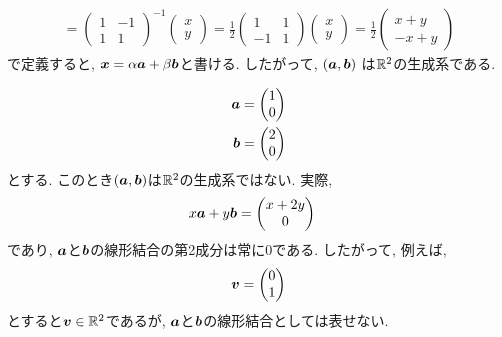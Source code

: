\begin{example}
\begin{align*}
=
    \begin{pmatrix}
      1&-1\\1&1
    \end{pmatrix}^{-1}
    \begin{pmatrix}
      x\\y
    \end{pmatrix}
= \frac{1}{2}
    \begin{pmatrix}
      1&1\\-1&1
    \end{pmatrix}
    \begin{pmatrix}
      x\\y
    \end{pmatrix}
=\frac{1}{2}
    \begin{pmatrix}
      x+y\\-x+y
    \end{pmatrix}
  \end{align*}
  で定義すると,
  $\boldsymbol{x}=\alpha\boldsymbol{a}+\beta\boldsymbol{b}$と書ける.
  したがって,
  $(\boldsymbol{a},\boldsymbol{b})$ は$\mathbb{R}^2$の生成系である.
\end{example}

\begin{example}
  \begin{align*}
    \boldsymbol{a}&=\begin{pmatrix}1\\0\end{pmatrix}\\
    \boldsymbol{b}&=\begin{pmatrix}2\\0\end{pmatrix}
  \end{align*}
  とする.  このとき$(\boldsymbol{a},\boldsymbol{b})$は$\mathbb{R}^2$の生成系ではない.
  実際,
  \begin{align*}
    x\boldsymbol{a}+y\boldsymbol{b}&=\begin{pmatrix}x+2y\\0\end{pmatrix}
  \end{align*}
  であり, $\boldsymbol{a}$と$\boldsymbol{b}$の線形結合の第2成分は常に0である.
  したがって, 例えば,
  \begin{align*}
    \boldsymbol{v}=\begin{pmatrix}0\\1\end{pmatrix}
  \end{align*}
  とすると$\boldsymbol{v}\in\mathbb{R}^2$であるが,
  $\boldsymbol{a}$と$\boldsymbol{b}$の線形結合としては表せない.
\end{example}


